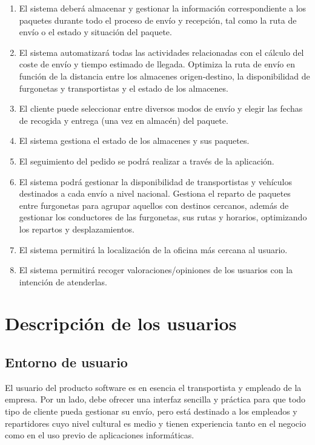 \begin{enumerate}
	\item El sistema deberá almacenar y gestionar la información correspondiente a los paquetes durante todo el proceso de envío y recepción, tal como la ruta de envío o el estado y situación del paquete.
	\item El sistema automatizará todas las actividades relacionadas con el cálculo del coste de envío y tiempo estimado de llegada. Optimiza la ruta de envío en función de la distancia entre los almacenes origen-destino, la disponibilidad de furgonetas y transportistas y el estado de los almacenes.
	\item El cliente puede seleccionar entre diversos modos de envío y elegir las fechas de recogida y entrega (una vez en almacén) del paquete.
	\item El sistema gestiona el estado de los almacenes y sus paquetes.
	\item El seguimiento del pedido se podrá realizar a través de la aplicación.
	\item El sistema podrá gestionar la disponibilidad de transportistas y vehículos destinados a cada envío a nivel nacional. Gestiona el reparto de paquetes entre furgonetas para agrupar aquellos con destinos cercanos, además de gestionar los conductores de las furgonetas, sus rutas y horarios, optimizando los repartos y desplazamientos.
	\item El sistema permitirá la localización de la oficina más cercana al usuario.
	\item El sistema permitirá recoger valoraciones/opiniones de los usuarios con la intención de atenderlas.\\
	 
\end{enumerate}

\newpage

\section{Descripción de los usuarios}
	\subsection{Entorno de usuario}
		El usuario del producto software es en esencia el transportista y empleado de la empresa. Por un lado, debe ofrecer una interfaz sencilla y práctica para que todo tipo de cliente pueda gestionar su envío, pero está destinado a los empleados y repartidores cuyo nivel cultural es medio y tienen experiencia tanto en el negocio como en el uso previo de aplicaciones informáticas.
	
